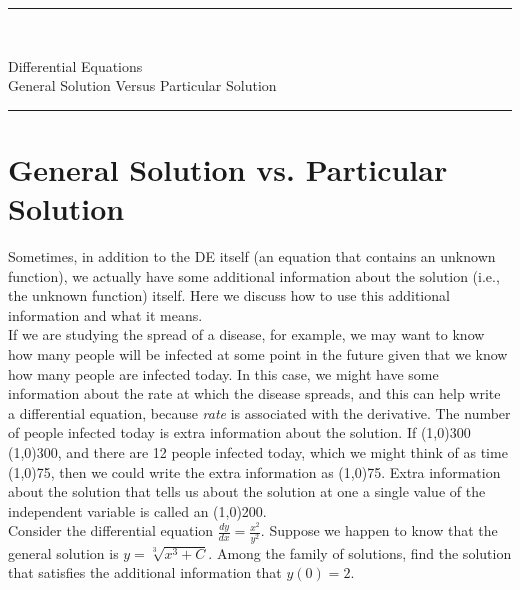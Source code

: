 \documentclass[12pt]{article}
\newcommand{\<}{\langle}
\renewcommand{\>}{\rangle}
\def\ds{\displaystyle}
\begin{document}
\noindent\rule{7in}{0.4pt}\\
\begin{center}
{\sc Differential Equations\\
General Solution Versus Particular Solution}
\end{center}
\noindent\rule{7in}{0.4pt}
\section*{General Solution vs. Particular Solution}
\doublespacing

\noindent  Sometimes, in addition to the DE itself (an equation that contains an unknown function), 
we actually have some additional information about the solution (i.e., the unknown function) itself.  
Here we discuss how to use this additional information and what it means.\\

\noindent  If we are studying the spread of a disease, for example, we may want to know
how many people will be infected at some point in the future given that we know how many people
are infected today.  In this case, we might have some information about the rate at which the
disease spreads, and this can help write a differential equation, because {\it rate} is associated with 
the derivative.  The number of people infected today is extra information about the solution.  If
\line(1,0){300} \line(1,0){300}, and there are 12 people infected today,
which we might think of as time %
\line(1,0){75}, then we could write the extra information as %
\line(1,0){75}.  Extra information about the solution that tells us about the solution at one 
a single value of the independent variable is called an %
\line(1,0){200}.\\

  Consider the differential equation $\ds \frac{dy}{dx} = \frac{x^2}{y^2}.$ 
	Suppose we happen to know that the general solution is $y = \sqrt[3]{x^3 + C}$.
	Among the family of solutions, find the solution that satisfies the additional 
	information that $y(0)=2$.\\
	\newpage
\end{document}
